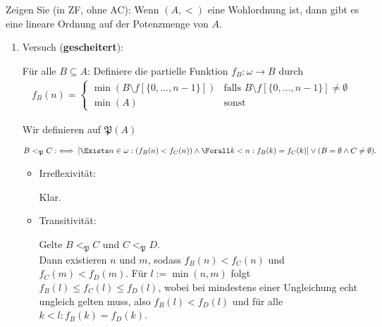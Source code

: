 
\begin{exercise}[287]

Zeigen Sie (in ZF, ohne AC): Wenn $(A,<)$ eine Wohlordnung ist, dann gibt es eine
lineare Ordnung auf der Potenzmenge von $A$.
\end{exercise}


\begin{solution}

\phantom{}

\begin{enumerate}[label = \arabic*.]

  \item Versuch (\textbf{gescheitert}):

  Für alle $B \subseteq A$: Definiere die partielle Funktion $f_B: \omega \to B$ durch
  \begin{align*}
    f_B(n)
    =
    \begin{cases}
      \min(B \setminus f[\{0,\dots,n-1\}]) & \text{falls }
      B \setminus f[\{0,\dots,n-1\}] \neq \emptyset \\
      \min(A) & \text{sonst}
    \end{cases}
  \end{align*}
  
  Wir definieren auf $\mathfrak{P}(A)$

  \begin{align*}
    B <_\mathfrak{P} C
    :\iff
    [\Exists n \in \omega: (f_B(n) < f_C(n)) \land \Forall k < n: f_B(k) = f_C(k)]
    \lor
    (B = \emptyset \land C \neq \emptyset).
  \end{align*}
  
  \begin{itemize}

    \item Irreflexivität:

    Klar.

    \item Transitivität:

    Gelte $B <_\mathfrak{P} C$ und $C <_\mathfrak{P} D$. \\
    Dann existieren $n$ und $m$, sodass $f_B(n) < f_C(n)$ und $f_C(m) < f_D(m)$.
    Für $l := \min(n, m)$ folgt $f_B(l) \leq f_C(l) \leq f_D(l)$, wobei bei mindestens einer Ungleichung echt ungleich gelten muss, also $f_B(l) < f_D(l)$ und für alle $k < l: f_B(k) = f_D(k)$.
  

\end{itemize}
\end{enumerate}
\end{solution}
